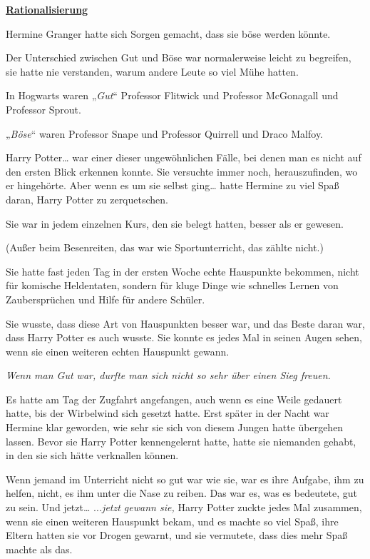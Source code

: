 

\hypertarget{rationalisierung}{%

\textbf{\uline{Rationalisierung}}

Hermine Granger hatte sich Sorgen gemacht, dass sie böse werden könnte.

Der Unterschied zwischen Gut und Böse war normalerweise leicht zu begreifen, sie hatte nie verstanden, warum andere Leute so viel Mühe hatten.

In Hogwarts waren „\emph{Gut}“ Professor Flitwick und Professor McGonagall und Professor Sprout.

„\emph{Böse}“ waren Professor Snape und Professor Quirrell und Draco Malfoy.

Harry Potter… war einer dieser ungewöhnlichen Fälle, bei denen man es nicht auf den ersten Blick erkennen konnte. Sie versuchte immer noch, herauszufinden, wo er hingehörte. Aber wenn es um sie selbst ging… hatte Hermine zu viel Spaß daran, Harry Potter zu zerquetschen.

Sie war in jedem einzelnen Kurs, den sie belegt hatten, besser als er gewesen.

(Außer beim Besenreiten, das war wie Sportunterricht, das zählte nicht.)

Sie hatte fast jeden Tag in der ersten Woche echte Hauspunkte bekommen, nicht für komische Heldentaten, sondern für kluge Dinge wie schnelles Lernen von Zaubersprüchen und Hilfe für andere Schüler.

Sie wusste, dass diese Art von Hauspunkten besser war, und das Beste daran war, dass Harry Potter es auch wusste. Sie konnte es jedes Mal in seinen Augen sehen, wenn sie einen weiteren echten Hauspunkt gewann.

\emph{Wenn man Gut war, durfte man sich nicht so sehr über einen Sieg freuen.}

Es hatte am Tag der Zugfahrt angefangen, auch wenn es eine Weile gedauert hatte, bis der Wirbelwind sich gesetzt hatte. Erst später in der Nacht war Hermine klar geworden, wie sehr sie sich von diesem Jungen hatte übergehen lassen. Bevor sie Harry Potter kennengelernt hatte, hatte sie niemanden gehabt, in den sie sich hätte verknallen können.

Wenn jemand im Unterricht nicht so gut war wie sie, war es ihre Aufgabe, ihm zu helfen, nicht, es ihm unter die Nase zu reiben. Das war es, was es bedeutete, gut zu sein. Und jetzt… ..\emph{.jetzt gewann sie,} Harry Potter zuckte jedes Mal zusammen, wenn sie einen weiteren Hauspunkt bekam, und es machte so viel Spaß, ihre Eltern hatten sie vor Drogen gewarnt, und sie vermutete, dass dies mehr Spaß machte als das.

}
